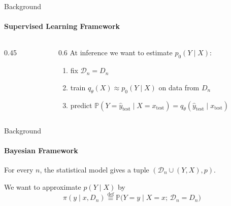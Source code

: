 \begin{frame}{Background}
  \framesubtitle{Supervised Learning Framework}

  \vspace*{\fill}
  \begin{columns}[c]
    \begin{column}{0.45\textwidth}
      \centering
    \end{column}
    \begin{column}{0.6\textwidth}
      At inference we want to estimate $p_0(Y \mid X)$:
      \begin{enumerate}
        \item fix $\mathcal{D}_n = D_n$
        \item train $q_\theta(X) \approx p_0(Y \mid X)$ on data from $D_n$
        \item predict $\mathbb{P}(Y = \hat{y}_{\text{test}} \mid X = x_{\text{test}}) = q_\theta(\hat{y}_{\text{test}} \mid x_{\text{test}})$
      \end{enumerate}
    \end{column}
  \end{columns}
  \vspace*{\fill}
\end{frame}

\begin{frame}{Background}
  \framesubtitle{Bayesian Framework}

  For every $n$, the statistical model gives a tuple $ (\mathcal{D}_n \cup (Y, X), p). $
  
  \vspace{0.25em}

  We want to approximate $p(Y \mid X)$ by
  \[
    \pi(y \mid x, D_n)
    \overset{\text{def}}{\equiv}
    \mathbb{P}\big(Y = y \mid X = x;\, \mathcal{D}_n = D_n\big)
  \]


  \vspace{1.0em}

\end{frame}

